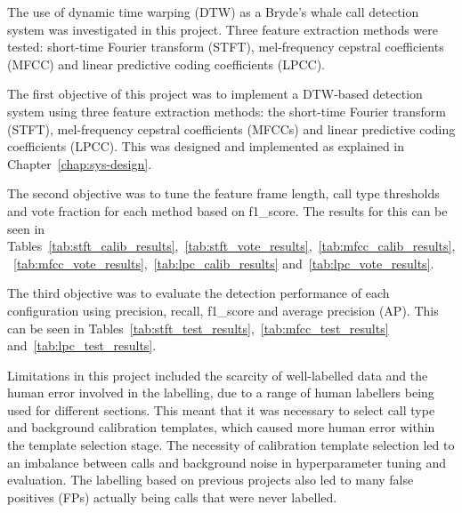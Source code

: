 \graphicspath{{conclusion/fig/}}

\label{chap:conclusion}

\label{sec:sum}

The use of dynamic time warping (\acs{DTW}) as a Bryde's whale call detection system was investigated in this project. Three feature 
extraction methods were tested: short-time Fourier transform (\acs{STFT}), mel-frequency cepstral coefficients (\acs{MFCC}) 
and linear predictive coding coefficients (\acs{LPCC}).

\label{sec:obj}
The first objective of this project was to implement a \acs{DTW}-based detection system using three feature extraction methods: 
the short-time Fourier transform (\acs{STFT}), mel-frequency cepstral coefficients (\acsp{MFCC}) and linear predictive coding coefficients (\acs{LPCC}). 
This was designed and implemented as explained in Chapter~\ref{chap:sys-design}.

The second objective was to tune the feature frame length, call type thresholds and vote fraction for each method based on \gls{f1_score}. 
The results for this can be seen in Tables~\ref{tab:stft_calib_results},~\ref{tab:stft_vote_results},~\ref{tab:mfcc_calib_results},~\ref{tab:mfcc_vote_results},~\ref{tab:lpc_calib_results} 
and~\ref{tab:lpc_vote_results}. 

The third objective was to evaluate the detection performance of each configuration using \gls{precision}, \gls{recall}, \gls{f1_score} 
and average precision (\acs{AP}). This can be seen in Tables~\ref{tab:stft_test_results},~\ref{tab:mfcc_test_results} and~\ref{tab:lpc_test_results}.

\label{sec:lim}

Limitations in this project included the scarcity of well-labelled data and the human error involved in the 
labelling, due to a range of human labellers being used for different sections. This meant that it was necessary 
to select call type and background calibration templates, which caused more human error within the template 
selection stage. The necessity of calibration template selection led to an imbalance between calls and background 
noise in hyperparameter tuning and evaluation. The labelling based on previous projects also led to many false positives (\acsp{FP}) 
actually being calls that were never labelled.

\label{sec:con}

